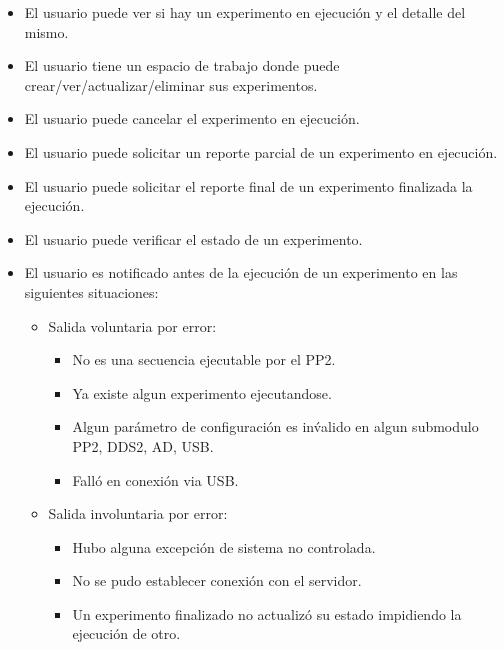 \begin{itemize}
\item El usuario puede ver si hay un experimento en ejecuci\'on y el detalle del mismo.
\item El usuario tiene un espacio de trabajo donde puede crear/ver/actualizar/eliminar sus experimentos.
\item El usuario puede cancelar el experimento en ejecuci\'on.
\item El usuario puede solicitar un reporte parcial de un experimento en ejecuci\'on.
\item El usuario puede solicitar el reporte final de un experimento finalizada la ejecuci\'on.
\item El usuario puede verificar el estado de un experimento.
\item El usuario es notificado antes de la ejecuci\'on de un experimento en las siguientes situaciones:
    \begin{itemize}
    \item Salida voluntaria por error:
        \begin{itemize}
        \item No es una secuencia ejecutable por el PP2.
        \item Ya existe algun experimento ejecutandose.
        \item Algun par\'ametro de configuraci\'on es in\'valido en algun submodulo PP2, DDS2, AD, USB.
        \item Fall\'o en conexi\'on via USB.
        \end{itemize}
    \end{itemize}    
    \begin{itemize}    
    \item Salida involuntaria por error:
        \begin{itemize}
        \item Hubo alguna excepci\'on de sistema no controlada.
        \item No se pudo establecer conexi\'on con el servidor.
        \item Un experimento finalizado no actualiz\'o su estado impidiendo la ejecuci\'on de otro.
        \end{itemize}
    \end{itemize}
\end{itemize}

